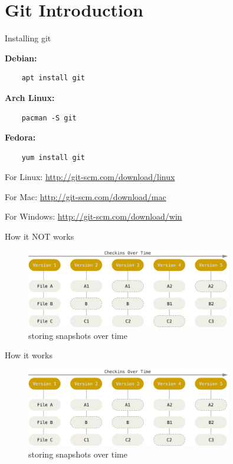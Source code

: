 \section{Git Introduction}

\begin{frame}[fragile]{Installing git}

    \textbf{Debian:}
    \begin{lstlisting}
    apt install git
    \end{lstlisting}

    \textbf{Arch Linux:}
    \begin{lstlisting}
    pacman -S git
    \end{lstlisting}

    \textbf{Fedora:}
    \begin{lstlisting}
    yum install git
    \end{lstlisting}

    \begin{description}
        \item{For Linux:} \url{http://git-scm.com/download/linux}
        \item{For Mac:} \url{http://git-scm.com/download/mac}
        \item{For Windows:} \url{http://git-scm.com/download/win}
    \end{description}

\end{frame}

\begin{frame}[fragile]{How it NOT works}
    \begin{figure}
        \centering
        \includegraphics[width=0.8\textwidth]{img/snapshotbased.png}
        \caption{storing snapshots over time}
    \end{figure}
\end{frame}

\begin{frame}[fragile]{How it works}
    \begin{figure}
        \centering
        \includegraphics[width=0.8\textwidth]{img/snapshotbased.png}
        \caption{storing snapshots over time}
    \end{figure}
\end{frame}

